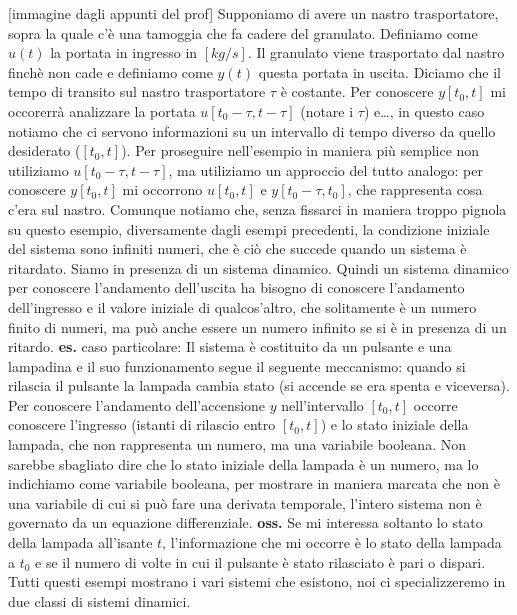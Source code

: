[immagine dagli appunti del prof]\newline
Supponiamo di avere un nastro trasportatore, sopra la quale c'è una tamoggia che fa cadere del granulato. Definiamo come $u(t)$ la portata in ingresso in $[kg/s]$. Il granulato viene trasportato dal nastro finchè non cade e definiamo come $y(t)$ questa portata in uscita. Diciamo che il tempo di transito sul nastro trasportatore $\tau$ è costante.\newline
Per conoscere $y[t_0,t]$ mi occorerrà analizzare la portata $u[t_0-\tau,t-\tau]$ (notare i $\tau$) e\dots, in questo caso notiamo che ci servono informazioni su un intervallo di tempo diverso da quello desiderato ($[t_0,t]$). Per proseguire nell'esempio in maniera più semplice non utiliziamo $u[t_0-\tau,t-\tau]$, ma utiliziamo un approccio del tutto analogo: per conoscere $y[t_0,t]$ mi occorrono $u[t_0,t]$ e $y[t_0-\tau,t_0]$, che rappresenta cosa c'era sul nastro. Comunque notiamo che, senza fissarci in maniera troppo pignola su questo esempio, diversamente dagli esempi precedenti, la condizione iniziale del sistema sono infiniti numeri, che è ciò che succede quando un sistema è ritardato.\newline
Siamo in presenza di un sistema dinamico.\newline
\newline
Quindi un sistema dinamico per conoscere l'andamento dell'uscita ha bisogno di conoscere l'andamento dell'ingresso e il valore iniziale di qualcos'altro, che solitamente è un numero finito di numeri, ma può anche essere un numero infinito se si è in presenza di un ritardo.\newline
\newline
\textbf{es.} caso particolare:\newline
Il sistema è costituito da un pulsante e una lampadina e il suo funzionamento segue il seguente meccanismo: quando si rilascia il pulsante la lampada cambia stato (si accende se era spenta e viceversa).\newline
Per conoscere l'andamento dell'accensione $y$ nell'intervallo $[t_0,t]$ occorre conoscere l'ingresso (istanti di rilascio entro $[t_0,t]$) e lo stato iniziale della lampada, che non rappresenta un numero, ma una variabile booleana. Non sarebbe sbagliato dire che lo stato iniziale della lampada è un numero, ma lo indichiamo come variabile booleana, per mostrare in maniera marcata che non è una variabile di cui si può fare una derivata temporale, l'intero sistema non è governato da un equazione differenziale.\newline
\textbf{oss.} Se mi interessa soltanto lo stato della lampada all'isante $t$, l'informazione che mi occorre è lo stato della lampada a $t_0$ e se il numero di volte in cui il pulsante è stato rilasciato è pari o dispari.\newline
\newline
Tutti questi esempi mostrano i vari sistemi che esistono, noi ci specializzeremo in due classi di sistemi dinamici.
